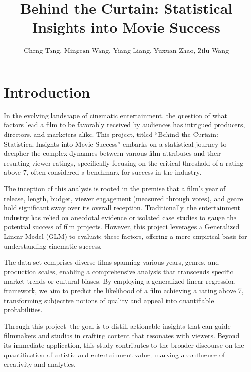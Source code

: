 \documentclass[
  11pt,
]{article}
\title{Behind the Curtain: Statistical Insights into Movie Success}
\author{Cheng Tang, Mingcan Wang, Yiang Liang, Yuxuan Zhao, Zilu Wang}
\date{}
\renewcommand*\contentsname{Table of contents}
\newcommand\contentsname{Table of contents}
\begin{document}
\maketitle
\ifdefined\Shaded\renewenvironment{Shaded}{\begin{tcolorbox}[enhanced, borderline west={3pt}{0pt}{shadecolor}, interior hidden, boxrule=0pt, breakable, frame hidden, sharp corners]}{\end{tcolorbox}}\fi

\renewcommand*\contentsname{Table of contents}
{
\hypersetup{linkcolor=}
\setcounter{tocdepth}{3}
\tableofcontents
}
\hypertarget{introduction}{%
\section{Introduction}\label{introduction}}

In the evolving landscape of cinematic entertainment, the question of
what factors lead a film to be favorably received by audiences has
intrigued producers, directors, and marketers alike. This project,
titled ``Behind the Curtain: Statistical Insights into Movie Success''
embarks on a statistical journey to decipher the complex dynamics
between various film attributes and their resulting viewer ratings,
specifically focusing on the critical threshold of a rating above 7,
often considered a benchmark for success in the industry.

The inception of this analysis is rooted in the premise that a film's
year of release, length, budget, viewer engagement (measured through
votes), and genre hold significant sway over its overall reception.
Traditionally, the entertainment industry has relied on anecdotal
evidence or isolated case studies to gauge the potential success of film
projects. However, this project leverages a Generalized Linear Model
(GLM) to evaluate these factors, offering a more empirical basis for
understanding cinematic success.

The data set comprises diverse films spanning various years, genres, and
production scales, enabling a comprehensive analysis that transcends
specific market trends or cultural biases. By employing a generalized
linear regression framework, we aim to predict the likelihood of a film
achieving a rating above 7, transforming subjective notions of quality
and appeal into quantifiable probabilities.

Through this project, the goal is to distill actionable insights that
can guide filmmakers and studios in crafting content that resonates with
viewers. Beyond its immediate application, this study contributes to the
broader discourse on the quantification of artistic and entertainment
value, marking a confluence of creativity and analytics.
\end{document}
